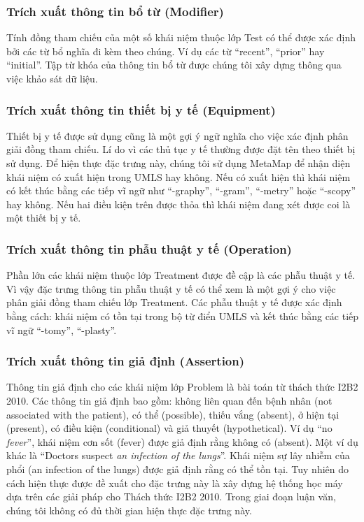 \subsubsection*{Trích xuất thông tin bổ từ (Modifier)}
Tính đồng tham chiếu của một số khái niệm thuộc lớp Test có thể được xác định bởi các từ bổ nghĩa đi kèm theo chúng. Ví dụ các từ “recent”, “prior” hay “initial”. Tập từ khóa của thông tin bổ từ được chúng tôi xây dựng thông qua việc khảo sát dữ liệu.

\subsubsection*{Trích xuất thông tin thiết bị y tế (Equipment)}
Thiết bị y tế được sử dụng cũng là một gợi ý ngữ nghĩa cho việc xác định phân giải đồng tham chiếu. Lí do vì các thủ tục y tế thường được đặt tên theo thiết bị sử dụng. Để hiện thực đặc trưng này, chúng tôi sử dụng MetaMap để nhận diện khái niệm có xuất hiện trong UMLS hay không. Nếu có xuất hiện thì khái niệm có kết thúc bằng các tiếp vĩ ngữ như ``-graphy'', ``-gram'', ``-metry'' hoặc ``-scopy'' hay không. Nếu hai điều kiện trên được thỏa thì khái niệm đang xét được coi là một thiết bị y tế.

\subsubsection*{Trích xuất thông tin phẫu thuật y tế (Operation)}
Phần lớn các khái niệm thuộc lớp Treatment được đề cập là các phẫu thuật y tế. Vì vậy đặc trưng thông tin phẫu thuật y tế có thể xem là một gợi ý cho việc phân giải đồng tham chiếu lớp Treatment. Các phẫu thuật y tế được xác định bằng cách: khái niệm có tồn tại trong bộ từ điển UMLS và kết thúc bằng các tiếp vĩ ngữ ``-tomy'', ``-plasty''.

\subsubsection*{Trích xuất thông tin giả định (Assertion)}
Thông tin giả định cho các khái niệm lớp Problem là bài toán từ thách thức I2B2 2010. Các thông tin giả định bao gồm: không liên quan đến bệnh nhân (not associated with the patient), có thể (possible), thiếu vắng (absent), ở hiện tại (present), có điều kiện (conditional) và giả thuyết (hypothetical). Ví dụ ``no \textit{fever}'', khái niệm cơn sốt (fever) được giả định rằng không có (absent). Một ví dụ khác là ``Doctors suspect \textit{an infection of the lungs}''. Khái niệm sự lây nhiễm của phổi (an infection of the lungs) được giả định rằng có thể tồn tại. Tuy nhiên do cách hiện thực được đề xuất cho đặc trưng này là xây dựng hệ thống học máy dựa trên các giải pháp cho Thách thức I2B2 2010. Trong giai đoạn luận văn, chúng tôi không có đủ thời gian hiện thực đặc trưng này.


